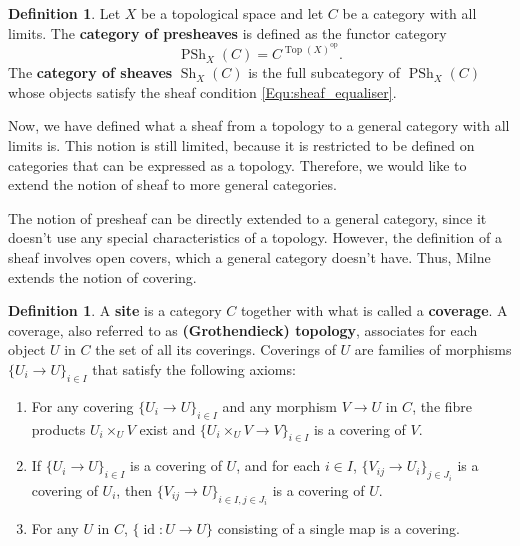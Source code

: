 \documentclass{report}
\DeclareMathOperator{\Top}{Top}
\DeclareMathOperator{\id}{id}
\DeclareMathOperator{\PSh}{PSh}
\DeclareMathOperator{\Sh}{Sh}
\theoremstyle{definition}
\newtheorem{definition}[equation]{Definition}
\begin{document}
\begin{definition}
Let $X$ be a topological space and let $C$ be a category with all limits. The \textbf{category of presheaves} is defined as the functor category
\[\PSh_X(C)=C^{\Top(X)^{\text{op}}}.\]
The \textbf{category of sheaves} $\Sh_X(C)$ is the full subcategory of $\PSh_X(C)$ whose objects satisfy the sheaf condition \eqref{Equ:sheaf_equaliser}.
\end{definition}
\vspace{2mm}

Now, we have defined what a sheaf from a topology to a general category with all limits is. This notion is still limited, because it is restricted to be defined on categories that can be expressed as a topology. Therefore, we would like to extend the notion of sheaf to more general categories.

The notion of presheaf can be directly extended to a general category, since it doesn't use any special characteristics of a topology. However, the definition of a sheaf involves open covers, which a general category doesn't have. Thus, Milne \cite[Section~I.5]{milne2013lectures} extends the notion of covering.

\begin{definition}
\label{Def:site}
A \textbf{site} is a category $C$ together with what is called a \textbf{coverage}. A coverage, also referred to as \textbf{(Grothendieck) topology}, associates for each object $U$ in $C$ the set of all its coverings. Coverings of $U$ are families of morphisms $\{U_i\rightarrow U\}_{i\in I}$ that satisfy the following axioms:
\begin{enumerate}
\item\label{Def:site:coverage_product} For any covering $\{U_i\rightarrow U\}_{i\in I}$ and any morphism $V\rightarrow U$ in $C$, the fibre products $U_i\times_UV$ exist and $\{U_i\times_UV\rightarrow V\}_{i\in I}$ is a covering of $V$.

\item If $\{U_i\rightarrow U\}_{i\in I}$ is a covering of $U$, and for each $i\in I$, $\{V_{ij}\rightarrow U_i\}_{j\in J_i}$ is a covering of $U_i$, then $\{V_{ij}\rightarrow U\}_{i\in I,j\in J_i}$ is a covering of $U$.

\item For any $U$ in $C$, $\{\id:U\rightarrow U\}$ consisting of a single map is a covering.
\end{enumerate}
\end{definition}
\end{document}
